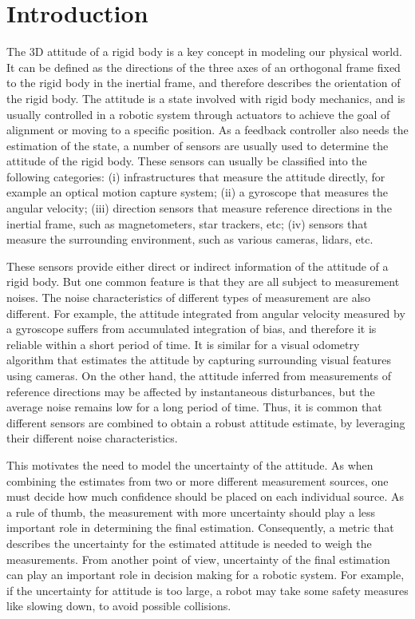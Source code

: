 
\chapter{Introduction} \label{chap:introduction}

The 3D attitude of a rigid body is a key concept in modeling our physical world.
It can be defined as the directions of the three axes of an orthogonal frame fixed to the rigid body in the inertial frame, and therefore describes the orientation of the rigid body.
The attitude is a state involved with rigid body mechanics, and is usually controlled in a robotic system through actuators to achieve the goal of alignment or moving to a specific position.
As a feedback controller also needs the estimation of the state, a number of sensors are usually used to determine the attitude of the rigid body.
These sensors can usually be classified into the following categories:
(i) infrastructures that measure the attitude directly, for example an optical motion capture system;
(ii) a gyroscope that measures the angular velocity;
(iii) direction sensors that measure reference directions in the inertial frame, such as magnetometers, star trackers, etc;
(iv) sensors that measure the surrounding environment, such as various cameras, lidars, etc.

These sensors provide either direct or indirect information of the attitude of a rigid body.
But one common feature is that they are all subject to measurement noises.
The noise characteristics of different types of measurement are also different.
For example, the attitude integrated from angular velocity measured by a gyroscope suffers from accumulated integration of bias, and therefore it is reliable within a short period of time.
It is similar for a visual odometry algorithm that estimates the attitude by capturing surrounding visual features using cameras.
On the other hand, the attitude inferred from measurements of reference directions may be affected by instantaneous disturbances, but the average noise remains low for a long period of time.
Thus, it is common that different sensors are combined to obtain a robust attitude estimate, by leveraging their different noise characteristics.

This motivates the need to model the uncertainty of the attitude.
As when combining the estimates from two or more different measurement sources, one must decide how much confidence should be placed on each individual source.
As a rule of thumb, the measurement with more uncertainty should play a less important role in determining the final estimation.
Consequently, a metric that describes the uncertainty for the estimated attitude is needed to weigh the measurements.
From another point of view, uncertainty of the final estimation can play an important role in decision making for a robotic system.
For example, if the uncertainty for attitude is too large, a robot may take some safety measures like slowing down, to avoid possible collisions.

